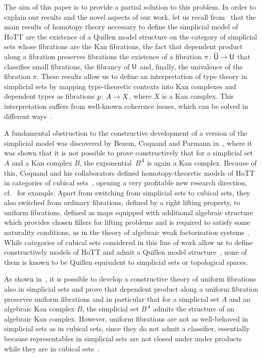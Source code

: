 \documentclass[reqno,10pt,a4paper,oneside,draft]{amsart}
\begin{document}
The aim of this paper is to provide a partial solution to this problem.  In order to
explain our results and the novel aspects of our work, let us recall from~\cite{voevodsky-simplicial-model} that the main results of  homotopy theory necessary 
to define the simplicial model of HoTT are 
the existence of a Quillen
model structure on the category of simplicial sets whose fibrations are the Kan fibrations, 
 the fact that dependent product along a fibration preserves fibrations 
 the existence of a fibration $\pi \colon \overline{\mathsf{U}} \to \mathsf{U}$ that classifies small fibrations, 
the fibrancy of $\mathsf{U}$ and, finally, the univalence of the fibration $\pi$. These results
allow us to define an interpretation of type theory in simplicial sets by mapping type-theoretic contexts
into Kan complexes and dependent types as fibrations $p  \colon A \to X$, where
$X$ is a Kan complex. This interpretation suffers from well-known coherence issues,
which can be solved in different ways~\cite{voevodsky-simplicial-model,LumsdaineP:locuoc}.



A fundamental obstruction to the constructive development of a version of the simplicial model was discovered by
Bezem, Coquand and Parmann in~\cite{coquand-non-constructivity-kan}, where it was shown that
it is not possible to prove constructively that for a simplicial set $A$ and a
Kan complex $B$, the exponential~$B^A$ is again a Kan complex.
Because of this, Coquand and his collaborators  defined homotopy-theoretic models of HoTT in categories of cubical sets~\cite{coquand-cubical-sets}, opening a very profitable new research direction, cf.~\cite{awodey-cubical,PittsAM:aximct} for example. Apart from switching 
from simplicial sets to cubical sets, they also switched from ordinary fibrations, defined by a right lifting property,
to uniform fibrations, defined as maps equipped with additional algebraic structure which provides
chosen fillers for lifting problems and is required to satisfy some naturality conditions, as in the
theory of algebraic weak factorisation systems~\cite{garner:small-object-argument}. While 
categories of cubical sets considered in this line of work allow us to define constructively models of HoTT 
and admit a Quillen
model structure~\cite{SattlerC:equepu}, none of them
 is known to be Quillen equivalent to simplicial sets or topological spaces.

As shown in~\cite{gambino2017frobenius}, it is possible to develop  a constructive theory of uniform fibrations
also in simplicial sets and prove that dependent product along a uniform fibration preserves
uniform fibrations and in particular that for a simplicial set $A$ and an 
 algebraic Kan complex $B$, the simplicial set $B^A$ admits the structure of an algebraic Kan complex. However,  uniform fibrations
are not as well-behaved in simplicial sets as in cubical sets,
since they do not admit a classifier, essentially because 
representables  in simplicial sets are not closed under under products while they are in cubical sets~\cite{SattlerC:faiaut}. 
\end{document}
